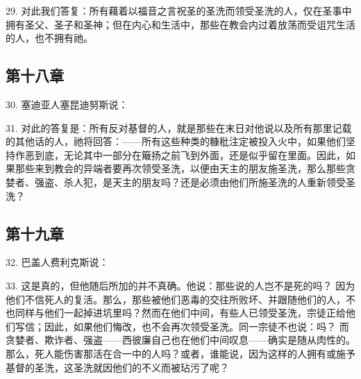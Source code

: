 29. 对此我们答复：所有藉着以福音之言祝圣的圣洗而领受圣洗的人，仅在圣事中拥有圣父、圣子和圣神；但在内心和生活中，那些在教会内过着放荡而受诅咒生活的人，也不拥有祂。\par


\subsection{第十八章}

30. 塞迪亚人塞昆迪努斯说：\par

31. 对此的答复是：所有反对基督的人，就是那些在末日对他说以及所有那里记载的其他话的人，祂将回答：——所有这些种类的糠秕注定被投入火中，如果他们坚持作恶到底，无论其中一部分在簸扬之前飞到外面，还是似乎留在里面。因此，如果那些来到教会的异端者要再次领受圣洗，以便由天主的朋友施圣洗，那么那些贪婪者、强盗、杀人犯，是天主的朋友吗？还是必须由他们所施圣洗的人重新领受圣洗？\par


\subsection{第十九章}

32. 巴盖人费利克斯说：\par

33. 这是真的，但他随后所加的并不真确。他说：那些说的人岂不是死的吗？ 因为他们不信死人的复活。那么，那些被他们恶毒的交往所败坏、并跟随他们的人，不也同样与他们一起掉进坑里吗？然而在他们中间，有些人已领受圣洗，宗徒正给他们写信；因此，如果他们悔改，也不会再次领受圣洗。同一宗徒不也说：吗？ 而贪婪者、欺诈者、强盗——西彼廉自己也在他们中间叹息——确实是随从肉性的。那么，死人能伤害那活在合一中的人吗？或者，谁能说，因为这样的人拥有或施予基督的圣洗，这圣洗就因他们的不义而被玷污了呢？\par

